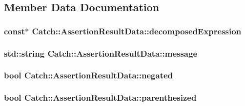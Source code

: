 \subsection{Member Data Documentation}
\hypertarget{struct_catch_1_1_assertion_result_data_a45b2bf2ed11da83d09dd78a2b7a44cd4}{
\subsubsection[{decomposed\-Expression}]{ const$\ast$ Catch\-::\-Assertion\-Result\-Data\-::decomposed\-Expression\hspace{0.3cm}{\ttfamily [mutable]}}}\label{struct_catch_1_1_assertion_result_data_a45b2bf2ed11da83d09dd78a2b7a44cd4}
\hypertarget{struct_catch_1_1_assertion_result_data_ac34215803c4c4a88f795879f61c1f7b4}{
\subsubsection[{message}]{\setlength{\rightskip}{0pt plus 5cm}std\-::string Catch\-::\-Assertion\-Result\-Data\-::message}}\label{struct_catch_1_1_assertion_result_data_ac34215803c4c4a88f795879f61c1f7b4}
\hypertarget{struct_catch_1_1_assertion_result_data_a17773c6f999cfded12e470b0321694a1}{
\subsubsection[{negated}]{\setlength{\rightskip}{0pt plus 5cm}bool Catch\-::\-Assertion\-Result\-Data\-::negated}}\label{struct_catch_1_1_assertion_result_data_a17773c6f999cfded12e470b0321694a1}
\hypertarget{struct_catch_1_1_assertion_result_data_a8418e3744b5486cb7f0d79c84569078e}{
\subsubsection[{parenthesized}]{\setlength{\rightskip}{0pt plus 5cm}bool Catch\-::\-Assertion\-Result\-Data\-::parenthesized}}\label{struct_catch_1_1_assertion_result_data_a8418e3744b5486cb7f0d79c84569078e}
